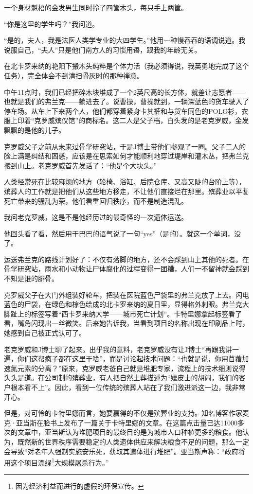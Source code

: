 \documentclass[12pt,oneside]{book}
\begin{document}
\begin{bookref}[frametitle={\cite{好好告别}}]
一个身材魁梧的金发男生同时拎了四筐木头，每只手上两筐。

“你是这里的学生吗？”我问道。

“是的，夫人，我是法医人类学专业的大四学生。”他用一种慢吞吞的语调说道。我说服自己，“夫人”只是他们南方人的习惯用语，跟我的年龄无关。

在北卡罗来纳的艳阳下搬木头纯粹是个体力活（我必须得说，我英勇地完成了这个任务），完全体会不到清扫骨灰时的那种禅意。

中午11点时，我们已经把碎木块堆成了一个2英尺高的长方体，就差让志愿者——也就是我们的弗兰克——躺进去了。说曹操，曹操就到，一辆深蓝色的货车驶入了停车场。从车上下来两个人，他们都穿着紧身卡其裤和与货车同色的POLO衫，衣服上印着“克罗威殡仪馆”的商标名。这二人是父子档，白头发的是老克罗威，金发飘飘的是他的儿子。

克罗威父子之前从未来过骨学研究站，于是J博士带他们参观了一圈。父子二人的脸上满是纠结和困惑，应该是在思索如何才能顺利地穿过堤岸和灌木丛，把弗兰克搬到山上。老克罗威首先发话了：“他是个大块头。”

人类经常死在比较麻烦的地方（轮椅、浴缸、后院仓库、又高又陡的台阶上等），殡葬人的工作就是把他们从这些地方移走，不让他们直接烂在那里。殡葬业以平复死亡带来的骚乱为荣，他们看重回归秩序，而不是制造混乱。

我问老克罗威，这是不是他经历过的最奇怪的一次遗体运送。

他回头看了看，然后用干巴巴的语气说了一句“yes”（是的）。就这一个单词，没了。

运送弗兰克的路线计划好了：不仅有落脚的地方，还不会踩到山上其他的死者。在骨学研究站，雨水和小动物让尸体腐化的过程变得一团糟，人们一不留神就会踩到不知是谁的腓骨。

克罗威父子在大门外组装好轮车，把装在医院蓝色尸袋里的弗兰克放了上去。闪电蓝色的尸袋，在绿色和棕色绘成的北卡罗来纳的夏日里，显得格外刺眼。弗兰克大脚趾上的标签写着“西卡罗来纳大学——城市死亡计划”。卡特里娜拿起标签看了看，嘴角闪现出一丝微笑。后来她告诉我，当看到项目的名称出现在印刷品上时，她感到自己被正式认可了。

老克罗威和J博士聊了起来。出乎我的意料，老克罗威没有让J博士“再跟我讲一遍，你们这帮疯子都在这里干啥”，而是讨论起技术问题：“也就是说，你用苜蓿加速氮元素的分离？”原来，克罗威老爸自己就是堆肥专家，流程上的技术细则说得头头是道。在公司制的殡葬业，有人把自然土葬描述为“嬉皮士的胡闹，我们的客户根本看不上”。因此，看到一位传统的殡葬人站在了我们激进派这一边，我非常开心。

但是，对可怜的卡特里娜而言，她要赢得的不仅是殡葬业的支持。知名博客作家麦克·亚当斯在脸书上发布了一篇关于卡特里娜的文章。在这篇点击量已达11000多次的文章中，亚当斯认为堆肥项目的最终目的是为城市人口种植更多的粮食。他认为，既然新的世界秩序需要稳定的人类遗体供应来解决粮食不足的问题，那么一定会导致“对老年人强制实施安乐死，获取其遗体进行堆肥”。亚当斯声称：“政府将用这个项目漂绿\footnote{因为经济利益而进行的虚假的环保宣传。}大规模屠杀行为。”


\end{bookref}
\end{document}
